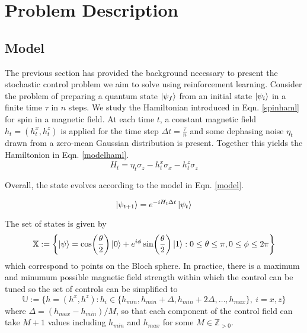 \documentclass[{../RL_for_QSP.tex}]{subfiles}
\begin{document}
    \section{Problem Description}
    \label{sec:PD}


\subsection{Model}
The previous section has provided the background necessary to present the stochastic control problem we aim to solve using reinforcement learning. Consider the problem of preparing a quantum state $\ket{\psi_f}$ from an initial state $\ket{\psi_i}$ in a finite time $\tau$ in $n$ steps. We study the Hamiltonian introduced in Eqn. \ref{spinhaml} for spin in a magnetic field. At each time $t$, a constant magnetic field $h_t = (h_t^x,h_t^z)$ is applied for the time step $\Delta t = \frac{\tau}{n}$ and some dephasing noise $\eta_t$ drawn from a zero-mean Gaussian distribution is present. Together this yields the Hamiltonion in Eqn. \ref{modelhaml}.
\begin{equation}\label{modelhaml}
     H_t = \eta_t\sigma_z -h_t^x \sigma_x - h_t^z\sigma_z
\end{equation}

Overall, the state evolves according to the model in Eqn. \ref{model}.

\begin{equation}\label{model}
     \ket{\psi_{t+1}} = e^{-i H_t \Delta t}\ket{\psi_t}
\end{equation}

The set of states is given by 
$$\mathbb{X} := \left\{ \ket{\psi} = \cos(\frac{\theta}{2})\ket{0} + e^{i\phi}\sin(\frac{\theta}{2})\ket{1} : 0 \leq \theta \leq \pi, 0 \leq \phi \leq 2 \pi \right\}$$ 
which correspond to points on the Bloch sphere. In practice, there is a maximum and minumum possible magnetic field strength within which the control can be tuned so the set of controls can be simplified to
$$\mathbb{U} := \{ h = (h^x,h^z) : h_i \in \{h_{min}, h_{min} + \Delta, h_{min} + 2\Delta, \hdots , h_{max}\}, \: i = x,z\}$$
where $\Delta = (h_{max} - h_{min})/M$, so that each component of the control field can take $M + 1$ values including $h_{min}$ and $h_{max}$ for some $M \in \mathbb{Z}_{>0}$.
\end{document}
